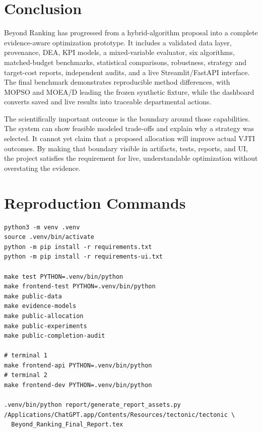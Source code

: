 \documentclass[12pt,a4paper]{report}
\begin{document}
\chapter{Conclusion}
Beyond Ranking has progressed from a hybrid-algorithm proposal into a complete evidence-aware optimization prototype. It includes a validated data layer, provenance, DEA, KPI models, a mixed-variable evaluator, six algorithms, matched-budget benchmarks, statistical comparisons, robustness, strategy and target-cost reports, independent audits, and a live Streamlit/FastAPI interface. The final benchmark demonstrates reproducible method differences, with MOPSO and MOEA/D leading the frozen synthetic fixture, while the dashboard converts saved and live results into traceable departmental actions.

The scientifically important outcome is the boundary around those capabilities. The system can show feasible modeled trade-offs and explain why a strategy was selected. It cannot yet claim that a proposed allocation will improve actual VJTI outcomes. By making that boundary visible in artifacts, tests, reports, and UI, the project satisfies the requirement for live, understandable optimization without overstating the evidence.




\appendix
\chapter{Reproduction Commands}
\begin{verbatim}
python3 -m venv .venv
source .venv/bin/activate
python -m pip install -r requirements.txt
python -m pip install -r requirements-ui.txt

make test PYTHON=.venv/bin/python
make frontend-test PYTHON=.venv/bin/python
make public-data
make evidence-models
make public-allocation
make public-experiments
make public-completion-audit

# terminal 1
make frontend-api PYTHON=.venv/bin/python
# terminal 2
make frontend-dev PYTHON=.venv/bin/python

.venv/bin/python report/generate_report_assets.py
/Applications/ChatGPT.app/Contents/Resources/tectonic/tectonic \
  Beyond_Ranking_Final_Report.tex
\end{verbatim}
\end{document}
